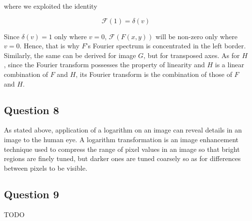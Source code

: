 where we exploited the identity

\begin{equation}
	\mathcal{F}(1) = \delta(v)
\end{equation}

Since $\delta(v) = 1$ only where $v=0$, $\mathcal{F}(F(x,y))$ will be non-zero only where $v=0$. Hence, that is why $F$'s Fourier spectrum is concentrated
in the left border. Similarly, the same can be derived for image $G$, but for transposed axes. As for $H$, since the Fourier transform possesses the property of
linearity and $H$ is a linear combination of $F$ and $H$, its Fourier transform is the combination of those of $F$ and $H$.


\subsection{Question 8}

As stated above, application of a logarithm on an image can reveal details in an image to the human eye. A logarithm transformation is an image
enhancement technique used to compress the range of pixel values in an image so that bright regions are finely tuned, but darker ones are tuned coarsely so 
as for differences between pixels to be visible.


\subsection{Question 9}
TODO





